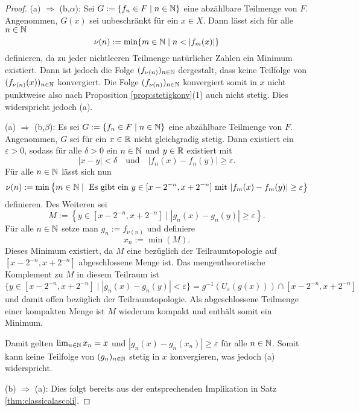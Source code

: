 \begin{proof}
  (a) $\Rightarrow$ (b,$\alpha$):
  Sei $G := \{f_n \in F \mid n \in \mathbb{N}\}$ eine abzählbare Teilmenge von $F$.
  Angenommen, $G(x)$ sei unbeschränkt für ein $x \in X$.
  Dann lässt sich für alle $n \in \mathbb{N}$
  \begin{displaymath}
    \nu(n) := \min \{ m \in \mathbb{N} \mid n < |f_m(x)| \}
  \end{displaymath}
  definieren, da zu jeder nichtleeren Teilmenge natürlicher Zahlen ein Minimum existiert.
  Dann ist jedoch die Folge $(f_{\nu(n)})_{n \in \mathbb{N}}$ dergestalt, dass keine Teilfolge von $(f_{\nu(n)}(x))_{n \in \mathbb{N}}$ konvergiert.
  Die Folge $(f_{\nu(n)})_{n \in \mathbb{N}}$ konvergiert somit in $x$ nicht punktweise also nach Proposition \ref{prop:stetigkonv}(1) auch nicht stetig.
  Dies widerspricht jedoch (a).

  (a) $\Rightarrow$ (b,$\beta$):
  Es sei $G := \{ f_n \in F \mid n \in \mathbb{N}\}$ eine abzählbare Teilmenge von $F$.
  Angenommen, $G$ sei für ein $x \in \mathbb{R}$ nicht gleichgradig stetig.
  Dann existiert ein $\varepsilon > 0$, sodass für alle $\delta > 0$ ein $n \in \mathbb{N}$ und $y \in \mathbb{R}$ existiert mit
  \begin{displaymath}
     |x - y| < \delta \quad\text{und}\quad |f_n(x) - f_n(y)| \geq \varepsilon.
  \end{displaymath}
  Für alle $n \in \mathbb{N}$ lässt sich nun
  \begin{displaymath}
    \nu(n) := \min \left\{ m \in \mathbb{N} \mid \text{ Es gibt ein } y \in [x - 2^{-n}, x + 2^{-n}] \text{ mit } |f_m(x) - f_m(y)| \geq \varepsilon \right\}
  \end{displaymath}
  definieren.
  Des Weiteren sei 
  \begin{displaymath}
    M := \left\{ y \in [x - 2^{-n}, x + 2^{-n}] \mid |g_n(x) - g_n(y)| \geq \varepsilon \right\}.
  \end{displaymath}
  Für alle $n \in \mathbb{N}$ setze man $g_n := f_{\nu(n)}$ und definiere  
  \begin{displaymath}
    x_n := \min (M).
  \end{displaymath}
  Dieses Minimum existiert, da $M$ eine bezüglich der Teilraumtopologie auf $[x - 2^{-n}, x + 2^{-n}]$ abgeschlossene Menge ist.
  Das mengentheoretische Komplement zu $M$ in diesem Teilraum ist 
  \begin{displaymath}
    \{y \in [x - 2^{-n}, x + 2^{-n}] \mid |g_n(x) - g_n(y)| < \varepsilon\} 
    = g^{-1}(U_\varepsilon(g(x))) \cap [x - 2^{-n}, x + 2^{-n}]
  \end{displaymath}
  und damit offen bezüglich der Teilraumtopologie.
  Als abgeschlossene Teilmenge einer kompakten Menge ist $M$ wiederum kompakt und enthält somit ein Minimum.

  Damit gelten $\lim_{n \in \mathbb{N}} x_n = x$ und $|g_n(x) - g_n(x_n)| \geq \varepsilon$ für alle $n \in \mathbb{N}$.
  Somit kann keine Teilfolge von $(g_n)_{n \in \mathbb{N}}$ stetig in $x$ konvergieren, was jedoch (a) widerspricht.

  (b) $\Rightarrow$ (a):
  Dies folgt bereits aus der entsprechenden Implikation in Satz \ref{thm:classicalascoli}.
\end{proof}
